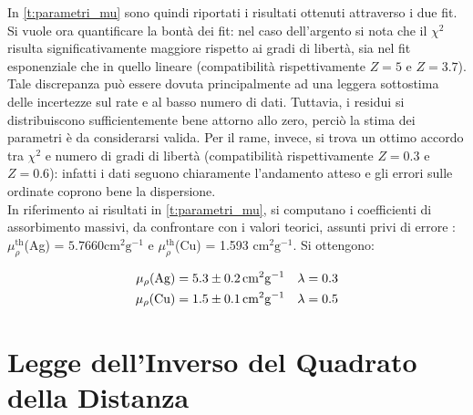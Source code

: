 \documentclass[twocolumn,10pt]{asme2ej}
\begin{document}
In \autoref{t:parametri_mu} sono quindi riportati i risultati ottenuti attraverso i due fit. Si vuole ora quantificare
la bontà dei fit: nel caso dell'argento si nota che il $\chi^2$ risulta significativamente maggiore rispetto ai gradi di
libertà, sia nel fit esponenziale che in quello lineare (compatibilità rispettivamente $Z=5$ e $Z=3.7$). Tale
discrepanza può essere dovuta principalmente ad una leggera sottostima delle incertezze sul rate e al basso numero di
dati. Tuttavia, i residui si distribuiscono sufficientemente bene attorno allo zero, perciò la stima dei parametri è da
considerarsi valida. Per il rame, invece, si trova un ottimo accordo tra $\chi^2$ e numero di gradi di libertà
(compatibilità rispettivamente $Z=0.3$ e $Z=0.6$): infatti i dati seguono chiaramente l'andamento atteso e gli errori
sulle ordinate coprono bene la dispersione. \\
In riferimento ai risultati in \autoref{t:parametri_mu}, si computano i coefficienti di assorbimento massivi, da
confrontare con i valori teorici, assunti privi di errore : $\mu_{\rho}^{\text{th}}$(Ag) =
$5.7660\si{\centi\metre^2\gram^{-1}}$ e $\mu_{\rho}^{\text{th}}$(Cu) = 1.593 $\si{\centi\metre^2\gram^{-1}}$. Si
ottengono:

 \vspace{-15pt}
\begin{align*}
    \mu_{\rho}(\text{Ag}) &= 5.3\pm 0.2 \,\si{\centi\metre^2\gram^{-1}} & \lambda &= 0.3 \\
    \mu_{\rho}(\text{Cu}) &= 1.5\pm 0.1 \,\si{\centi\metre^2\gram^{-1}} & \lambda &= 0.5 
    \vspace{-5pt}
\end{align*}

	



\section{Legge dell'Inverso del Quadrato della Distanza}\label{s:distanza}
\end{document}
